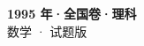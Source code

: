 \documentclass[zihao=-4, a4paper]{ctexart}
\begin{document}
\begin{center}
  {\Large\bfseries 1995 年·全国卷·理科}\\[4pt]
  {\large 数学 · 试题版}
\end{center}
\medskip
{}

\end{document}

